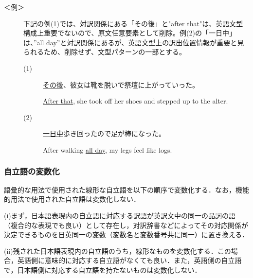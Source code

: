 \documentclass{nlp}
\begin{document}
\begin{description}
\item[＜例＞]下記の例(1)では、対訳関係にある「その後」と"after that"は、英語文型構成上重要でないので、原文任意要素として削除。例(2)の「一日中」は、”all day”と対訳関係にあるが、英語文型上の訳出位置情報が重要と見られるため、削除せず、文型パターンの一部とする。
\begin{description}
\item[(1)]  \underline{その後}、彼女は靴を脱いで祭壇に上がっていった。

\underline{After that}, she took off her shoes and stepped up to the alter. 
\item[(2)]  \underline{一日中}歩き回ったので足が棒になった。 

After walking \underline{all day}, my legs feel like logs. 
\end{description}

\end{description}

\subsubsection{自立語の変数化}
語彙的な用法で使用された線形な自立語を以下の順序で変数化する．なお，機能的用法で使用された自立語は変数化しない．

(i)まず，日本語表現内の自立語に対応する訳語が英訳文中の同一の品詞の語（複合的な表現でも良い）として存在し，対訳辞書などによってその対応関係が決定できるものを日英同一の変数（変数名と変数番号共に同一）に置き換える．

(ii)残された日本語表現内の自立語のうち，線形なものを変数化する．この場合，英語側に意味的に対応する自立語がなくても良い．また，英語側の自立語で，日本語側に対応する自立語を持たないものは変数化しない．
\end{document}
